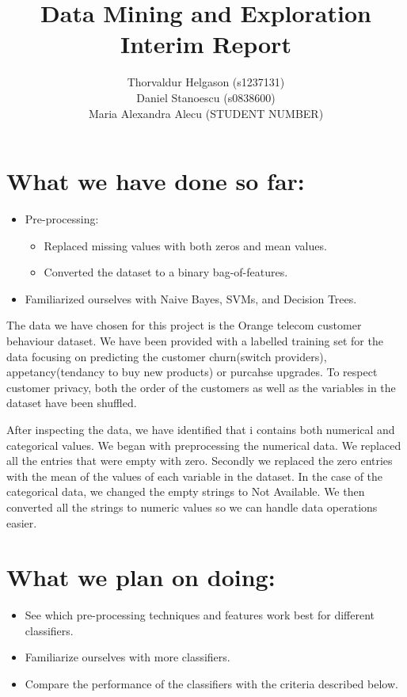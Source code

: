 \documentclass[a4paper,11pt]{article}
\title{Data Mining and Exploration\\Interim Report}
\author{Thorvaldur Helgason (s1237131) \\
Daniel Stanoescu (s0838600) \\
Maria Alexandra Alecu (STUDENT NUMBER)}
\begin{document}
    
\maketitle

\section*{What we have done so far:}
\begin{itemize}
	\item Pre-processing:
	\begin{itemize}
		\item Replaced missing values with both zeros and mean values.
		\item Converted the dataset to a binary bag-of-features.
	\end{itemize}
	\item Familiarized ourselves with Naive Bayes, SVMs, and Decision Trees.  
\end{itemize}

The data we have chosen for this project is the Orange telecom customer behaviour dataset. We have been provided with a labelled training set for the data focusing on predicting the customer churn(switch providers), appetancy(tendancy to buy new products) or purcahse upgrades. To respect customer privacy, both the order of the customers as well as the variables in the dataset have been shuffled.

After inspecting the data, we have identified that i contains both numerical and categorical values. We began with preprocessing the numerical data. We replaced all the entries that were empty with zero. Secondly we replaced the zero entries with the mean of the values of each variable in the dataset. In the case of the categorical data, we changed the empty strings to Not Available. We then converted all the strings to numeric values so we can handle data operations easier.

\section*{What we plan on doing:}
\begin{itemize}
	\item See which pre-processing techniques and features work best for different classifiers.
	\item Familiarize ourselves with more classifiers.
	\item Compare the performance of the classifiers with the criteria described below.
\end{itemize}
\end{document}
